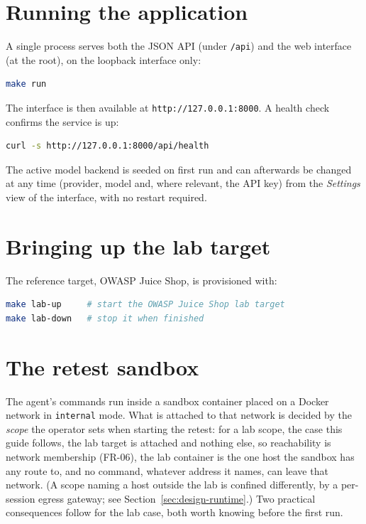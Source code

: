 \section{Running the application}
\label{sec:annex-run}

A single process serves both the JSON API (under \texttt{/api}) and the web
interface (at the root), on the loopback interface only:

\begin{lstlisting}[language=bash]
make run
\end{lstlisting}

The interface is then available at \texttt{http://127.0.0.1:8000}. A health check
confirms the service is up:

\begin{lstlisting}[language=bash]
curl -s http://127.0.0.1:8000/api/health
\end{lstlisting}

The active model backend is seeded on first run and can afterwards be changed at any
time (provider, model and, where relevant, the API key) from the
\emph{Settings} view of the interface, with no restart required.

\section{Bringing up the lab target}
\label{sec:annex-lab}

The reference target, OWASP Juice Shop, is provisioned with:

\begin{lstlisting}[language=bash]
make lab-up     # start the OWASP Juice Shop lab target
make lab-down   # stop it when finished
\end{lstlisting}

\section{The retest sandbox}
\label{sec:annex-sandbox}

The agent's commands run inside a sandbox container placed on a Docker network in
\texttt{internal} mode. What is attached to that network is decided by the
\emph{scope} the operator sets when starting the retest: for a lab scope, the
case this guide follows, the lab target is attached and nothing else, so
reachability is network membership (FR-06), the lab container is the one host the
sandbox has any route to, and no command, whatever address it names, can leave that
network. (A scope naming a host outside the lab is confined differently, by a
per-session egress gateway; see Section~\ref{sec:design-runtime}.) Two practical
consequences follow for the lab case, both worth knowing before the first run.

